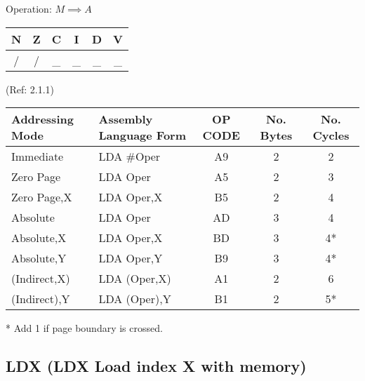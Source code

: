 \documentclass{article}
\begin{document}
  Operation:  $M \implies A$
  \begin{table}[H]
  \centering
  \begin{tabular}{|c c c c c c|}
  \hline
  N&Z&C&I&D&V\\
  \hline
  / & / & \_ & \_ & \_ & \_\\
  \hline
  \end{tabular}
  \end{table}
                                (Ref: 2.1.1)
  \begin{table}[H]
  \centering
  \begin{tabular}{|l|l|c|c|c|}
  \hline
   Addressing Mode& Assembly Language Form& OP CODE &No. Bytes&No. Cycles\\
  \hline
    Immediate     &   LDA \#Oper           &    A9   &    2    &    2     \\
    Zero Page     &   LDA Oper            &    A5   &    2    &    3     \\
    Zero Page,X   &   LDA Oper,X          &    B5   &    2    &    4     \\
    Absolute      &   LDA Oper            &    AD   &    3    &    4     \\
    Absolute,X    &   LDA Oper,X          &    BD   &    3    &    4*    \\
    Absolute,Y    &   LDA Oper,Y          &    B9   &    3    &    4*    \\
    (Indirect,X)  &   LDA (Oper,X)        &    A1   &    2    &    6     \\
    (Indirect),Y  &   LDA (Oper),Y        &    B1   &    2    &    5*    \\
  \hline
  \end{tabular}
  \end{table}
  * Add 1 if page boundary is crossed.

  \subsection{LDX (LDX Load index X with memory)}
\end{document}
